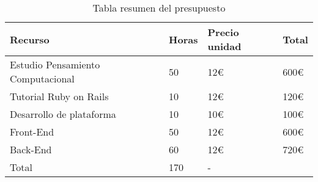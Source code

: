 \begin{table}[!ht]
\begin{center}
\begin{tabular}{|p{60mm}|p{20mm}|p{40mm}|p{25mm}|} \hline 
\textbf{Recurso} & \textbf{Horas} & \textbf{Precio unidad} & \textbf{Total}\\ \hline
Estudio Pensamiento Computacional & 50 & 12\euro & 600\euro \\ \hline

Tutorial Ruby on Rails & 10 & 12\euro & 120\euro \\ \hline

Desarrollo de plataforma & 10 & 10\euro & 100\euro \\ \hline

Front-End & 50 & 12\euro & 600\euro \\ \hline

Back-End & 60 & 12\euro & 720\euro \\ \hline

Total & 170 & - &  \\ \hline

\end{tabular}
\end{center}
\caption{Tabla resumen del presupuesto}
\label{table:resOthers}
\end{table}
